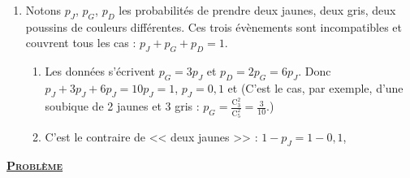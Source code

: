 \begin{enumerate}
\begin{enumerate}
            $V(X) = 10 - \left(\frac{23}{8}\right)^2 = \frac{640 - 529}{64}$, 
      \end{enumerate}
   \item Notons $p_J$, $p_G$, $p_D$ les probabilit\'es de prendre deux jaunes, deux gris, deux poussins de couleurs diff\'erentes.
      Ces trois \'ev\`enements sont incompatibles et couvrent tous les cas : $p_J + p_G + p_D = 1$.
      \begin{enumerate}
         \item {}
            Les donn\'ees s'\'ecrivent $p_G = 3p_J$ et $p_D = 2p_G = 6p_J$. Donc $p_J + 3p_J + 6p_J = 10p_J = 1$, $p_J = 0{,}1$ et
            (C'est le cas, par exemple, d'une soubique de 2 jaunes et 3 gris : $p_G = \frac{\mathrm{C}_3^2}{\mathrm{C}_5^2} = \frac{3}{10}$.)
         \item {}
            C'est le contraire de << deux jaunes >> : $1 - p_J = 1 - 0{,}1$, 
      \end{enumerate}
\end{enumerate}
\noindent \underline{\textsc{\textbf{Probl\`eme}}}
